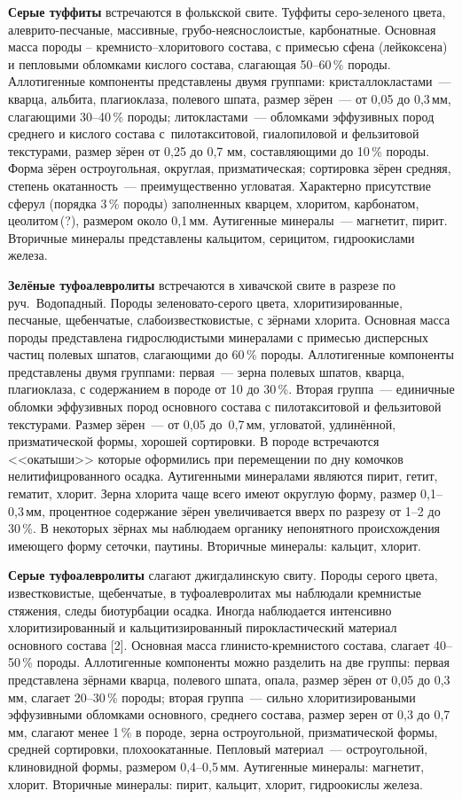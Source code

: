 \textbf{Серые туффиты} встречаются в фолькской свите. Туффиты серо-зеленого цвета, алеврито-песчаные, массивные, грубо-неяснослоистые, карбонатные. Основная масса породы – кремнисто–хлоритового состава, с примесью сфена (лейкоксена) и пепловыми обломками кислого состава, слагающая 50--60\,\% породы. Аллотигенные компоненты представлены двумя группами: кристаллокластами~--- кварца, альбита, плагиоклаза, полевого шпата, размер зёрен~--- от 0,05 до 0,3\,мм, слагающими 30--40\,\% породы; литокластами~--- обломками эффузивных пород среднего и кислого состава с~пилотакситовой, гиалопиловой и фельзитовой текстурами, размер зёрен от 0,25 до 0,7 мм, составляющими до 10\,\% породы. Форма зёрен остроугольная, округлая, призматическая; сортировка зёрен средняя, степень окатанность~--- преимущественно угловатая. Характерно присутствие сферул (порядка 3\,\% породы) заполненных кварцем, хлоритом, карбонатом, цеолитом\,(?), размером около 0,1\,мм. Аутигенные минералы~--- магнетит, пирит. Вторичные минералы представлены кальцитом, серицитом, гидроокислами железа.

\textbf{Зелёные туфоалевролиты} встречаются в хивачской свите в разрезе по руч.~Водопадный. Породы зеленовато-серого цвета, хлоритизированные, песчаные, щебенчатые, слабоизвестковистые, с зёрнами хлорита. Основная масса породы представлена гидрослюдистыми минералами с примесью дисперсных частиц полевых шпатов, слагающими до 60\,\% породы. Аллотигенные компоненты представлены двумя группами: первая~--- зерна полевых шпатов, кварца, плагиоклаза, с содержанием в породе от 10 до 30\,\%. Вторая группа~--- единичные обломки эффузивных пород основного состава с пилотакситовой и фельзитовой текстурами. Размер зёрен~--- от 0,05 до~0,7\,мм, угловатой, удлинённой, призматической формы, хорошей сортировки. В породе встречаются <<окатыши>> которые оформились при перемещении по дну комочков нелитифицрованного осадка. Аутигенными минералами являются пирит, гетит, гематит, хлорит. Зерна хлорита чаще всего имеют округлую форму, размер 0,1--0,3\,мм, процентное содержание зёрен увеличивается вверх по разрезу от 1--2 до 30\,\%. В некоторых зёрнах мы наблюдаем органику непонятного происхождения имеющего форму сеточки, паутины. Вторичные минералы: кальцит, хлорит.

\textbf{Серые туфоалевролиты} слагают джигдалинскую свиту. Породы серого цвета, известковистые, щебенчатые,  в туфоалевролитах мы наблюдали кремнистые стяжения, следы биотурбации осадка. Иногда наблюдается интенсивно хлоритизированный и кальцитизированный пирокластический материал основного состава [2]. Основная масса глинисто-кремнистого состава, слагает 40--50\,\% породы. Аллотигенные компоненты можно разделить на две группы: первая представлена  зёрнами кварца, полевого шпата, опала, размер зёрен от 0,05 до 0,3 мм, слагает 20--30\,\% породы; вторая группа~--- сильно хлоритизироваными эффузивными обломками основного, среднего состава, размер зерен от 0,3 до 0,7\,мм, слагают менее 1\,\% в породе, зерна остроугольной, призматической формы, средней сортировки, плохоокатанные. Пепловый материал~--- остроугольной, клиновидной формы, размером 0,4--0,5\,мм. Аутигенные минералы: магнетит, хлорит. Вторичные минералы: пирит, кальцит, хлорит, гидроокислы железа.

